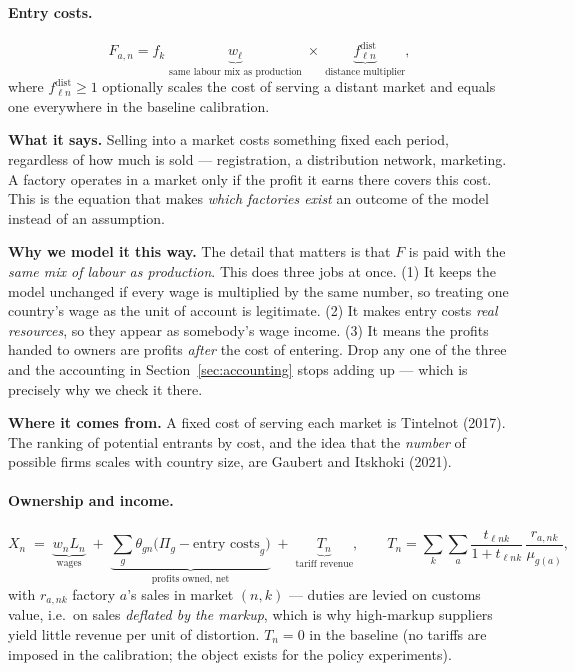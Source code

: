 \documentclass[11pt]{article}
\newcommand{\says}[1]{\smallskip\noindent\textbf{What it says.} #1\smallskip}
\newcommand{\why}[1]{\smallskip\noindent\textbf{Why we model it this way.} #1\smallskip}
\newcommand{\from}[1]{\smallskip\noindent\textbf{Where it comes from.} #1\smallskip}
\theoremstyle{plain}
\theoremstyle{remark}
\theoremstyle{definition}
\begin{document}
\paragraph{Entry costs.}

\begin{equation}
  F_{a,n}=f_k\;\underbrace{w_\ell}_{\text{same labour mix as production}}
  \;\times\;\underbrace{f^{\mathrm{dist}}_{\ell n}}_{\text{distance multiplier}},
  \label{eq:fixed}
\end{equation}
where $f^{\mathrm{dist}}_{\ell n}\ge1$ optionally scales the cost of serving a
distant market and equals one everywhere in the baseline calibration.

\says{Selling into a market costs something fixed each period, regardless of how much
is sold --- registration, a distribution network, marketing. A factory operates in a
market only if the profit it earns there covers this cost. This is the equation that
makes \emph{which factories exist} an outcome of the model instead of an assumption.}

\why{The detail that matters is that $F$ is paid with the \emph{same mix of labour as
production}. This does three jobs at once. (1) It keeps the model unchanged if every
wage is multiplied by the same number, so treating one country's wage as the unit of
account is legitimate. (2) It makes entry costs \emph{real resources}, so they appear
as somebody's wage income. (3) It means the profits handed to owners are profits
\emph{after} the cost of entering. Drop any one of the three and the accounting in
Section~\ref{sec:accounting} stops adding up --- which is precisely why we check it
there.}

\from{A fixed cost of serving each market is Tintelnot (2017). The ranking of
potential entrants by cost, and the idea that the \emph{number} of possible firms
scales with country size, are Gaubert and Itskhoki (2021).}

\paragraph{Ownership and income.}

\begin{equation}
  X_n \;=\; \underbrace{w_nL_n}_{\text{wages}}
  \;+\;\underbrace{\sum_g \theta_{gn}\bigl(\Pi_g-\text{entry costs}_g\bigr)}_{\text{profits owned, net}}
  \;+\;\underbrace{T_n}_{\text{tariff revenue}} ,
  \qquad
  T_n=\sum_{k}\sum_{a}\frac{t_{\ell nk}}{1+t_{\ell nk}}\,
      \frac{r_{a,nk}}{\mu_{g(a)}},
  \label{eq:income}
\end{equation}
with $r_{a,nk}$ factory $a$'s sales in market $(n,k)$ --- duties are levied on customs
value, i.e.\ on sales \emph{deflated by the markup}, which is why high-markup suppliers
yield little revenue per unit of distortion. $T_n=0$ in the baseline (no tariffs are
imposed in the calibration; the object exists for the policy experiments).
\end{document}
